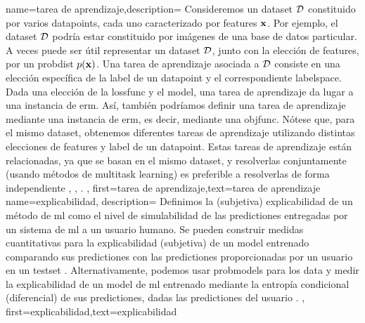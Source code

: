 {name={tarea de aprendizaje},description=
	{Consideremos un \gls{dataset} $\mathcal{D}$ constituido por varios \gls{datapoint}s, cada uno 
	caracterizado por \gls{feature}s ${\bf x}$. Por ejemplo, el \gls{dataset} $\mathcal{D}$ 
	podría estar constituido por imágenes de una base de datos particular. A veces puede ser útil 
	 representar un \gls{dataset} $\mathcal{D}$, junto con la elección de \gls{feature}s, por un \gls{probdist} $p({\bf x})$. 
	 Una tarea de aprendizaje asociada a $\mathcal{D}$ consiste en una elección específica de la 
	 \gls{label} de un \gls{datapoint} y el correspondiente \gls{labelspace}. 
	 Dada una elección de la \gls{lossfunc} y el \gls{model}, una tarea de aprendizaje da lugar 
	 a una instancia de \gls{erm}. Así, también podríamos definir una tarea de aprendizaje mediante una instancia de \gls{erm}, es decir, 
	 mediante una \gls{objfunc}. Nótese que, para el mismo \gls{dataset}, obtenemos diferentes tareas de aprendizaje utilizando 
	 distintas elecciones de \gls{feature}s y \gls{label} de un \gls{datapoint}. Estas tareas de aprendizaje  
	 están relacionadas, ya que se basan en el mismo \gls{dataset}, y resolverlas conjuntamente 
	 (usando métodos de \gls{multitask learning}) es preferible a resolverlas de forma independiente \cite{Caruana:1997wk}, \cite{JungGaphLassoSPL}, \cite{CSGraphSelJournal}.
	 },
	first={tarea de aprendizaje},text={tarea de aprendizaje}
	}
{name={explicabilidad},
	description={
		Definimos la (subjetiva) explicabilidad de un método de \gls{ml}
		como el nivel de simulabilidad \cite{Colin:2022aa} de las \gls{prediction}es
		entregadas por un sistema de \gls{ml} a un usuario humano.
		Se pueden construir medidas cuantitativas para la explicabilidad (subjetiva) de un \gls{model} entrenado
		comparando sus \gls{prediction}es con las \gls{prediction}es proporcionadas por un usuario
		en un \gls{testset} \cite{Zhang:2024aa,Colin:2022aa}.
		Alternativamente, podemos usar \gls{probmodel}s para los \gls{data}
		y medir la explicabilidad de un \gls{model} de \gls{ml} entrenado mediante la entropía condicional
		(diferencial) de sus \gls{prediction}es, dadas las \gls{prediction}es del usuario \cite{JunXML2020,Chen2018}.
	},
	first={explicabilidad},text={explicabilidad}
}
	
